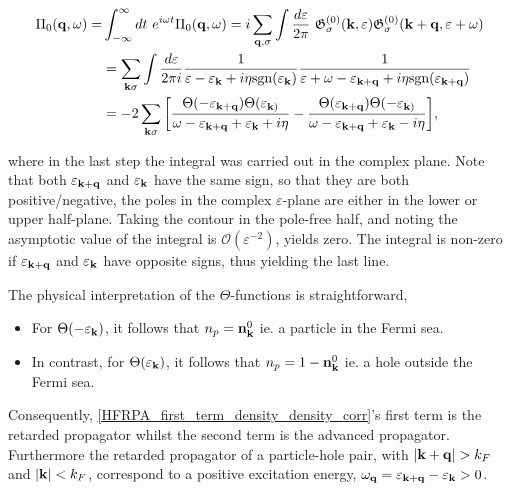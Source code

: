 \begin{equation}
\begin{split}
    \Pi_0({\bf q}, \omega) =& \int_{-\infty}^{\infty} dt \textnormal{ } e^{i\omega t} \Pi_0({\bf q}, \omega) = i \sum_{{\bf q}, \sigma} \int \frac{d\varepsilon}{2\pi} \textnormal{ } \mathfrak{G}_{\sigma}^{(0)}({\bf k}, \varepsilon)  \mathfrak{G}_{\sigma}^{(0)}({\bf k+q}, \varepsilon+\omega)\\
    &= \sum_{{\bf k} \sigma} \int \frac{d\varepsilon}{2\pi i} \frac{1}{\varepsilon - \varepsilon_{{\bf k}} + i \eta \textnormal{sgn}(\varepsilon_{{\bf k}})} \frac{1}{\varepsilon + \omega - \varepsilon_{{\bf k+q}} + i \eta \textnormal{sgn}(\varepsilon_{{\bf k+q}})} \\
    &= -2 \sum_{{\bf k} \sigma} \bigg[ \frac{\Theta(-\varepsilon_{{\bf k+q}}) \Theta(\varepsilon_{{\bf k})}}{\omega - \varepsilon_{{\bf k+q}} + \varepsilon_{{\bf k}} + i\eta} - \frac{\Theta(\varepsilon_{{\bf k+q}}) \Theta(-\varepsilon_{{\bf k})}}{\omega - \varepsilon_{{\bf k+q}} + \varepsilon_{{\bf k}} - i\eta}\bigg],
\end{split}
\label{HFRPA_first_term_density_density_corr}
\end{equation}

where in the last step the integral was carried out in the complex plane. Note that both $\varepsilon_{{\bf k+q}}$ and $\varepsilon_{{\bf k}}$ have the same sign, so that they are both positive/negative, the poles in the complex $\varepsilon$-plane are either in the lower or upper half-plane. 
Taking the contour in the pole-free half, and noting the asymptotic value of the integral is $\mathcal{O}(\varepsilon^{-2})$, yields zero. The integral is non-zero if  $\varepsilon_{{\bf k+q}}$ and $\varepsilon_{{\bf k}}$ have opposite signs, thus yielding the last line. 

The physical interpretation of the $\Theta$-functions is straightforward, 

\begin{itemize}
    \item For $\Theta(-\varepsilon_{{\bf k}})$, it follows that $n_p = {\bf n}_{\bf k}^{0}$ ie. a particle in the Fermi sea.
    \item In contrast, for $\Theta(\varepsilon_{{\bf k}})$, it follows that $n_p = 1-{\bf n}_{\bf k}^{0}$ ie. a hole outside the Fermi sea.
\end{itemize}

Consequently, \cref{HFRPA_first_term_density_density_corr}'s first term is the retarded propagator whilst the second term is the advanced propagator. Furthermore the retarded propagator of a particle-hole pair, with $|{\bf k+q}| > k_F$ and $|{\bf k}|<k_F$, correspond to a positive excitation energy, $\omega_{{\bf q}} = \varepsilon_{{\bf k+q}} - \varepsilon_{{\bf k}} > 0$. \\

